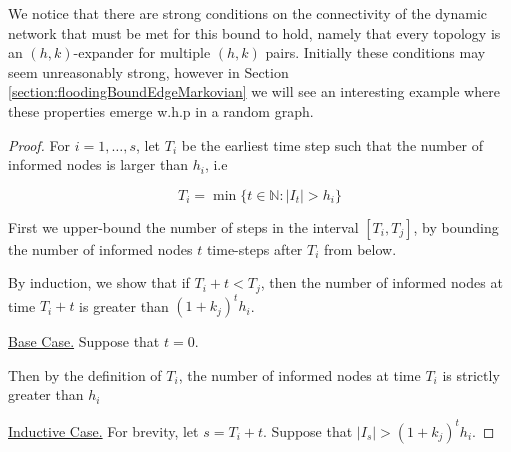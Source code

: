
We notice that there are strong conditions on the connectivity of the dynamic network that must be met for this bound to hold, namely that every topology is an $(h,k)$-expander for multiple $(h, k)$ pairs. Initially these conditions may seem unreasonably strong, however in Section \ref{section:floodingBoundEdgeMarkovian} we will see an interesting example where these properties emerge w.h.p in a random graph.

\begin{proof}
	For $i = 1,\dots, s$, let $T_i$ be the earliest time step such that the number of informed nodes is larger than $h_i$, i.e

	$$
		T_i = \min \{ t \in \mathbb{N} : |I_t| > h_i \}
	$$

	First we upper-bound the number of steps in the interval $[T_i, T_j]$, %
	by bounding the number of informed nodes $t$ time-steps after $T_i$ from below.

	By induction, we show that if $T_i + t < T_j$, then the number of informed nodes at time $T_i + t$ is greater than $(1+k_j)^t h_i$.
	
	\underline{Base Case.} Suppose that $t=0$. 
	
	Then by the definition of $T_i$, the number of informed nodes at time $T_i$ is strictly greater than $h_i$

	\underline{Inductive Case.} For brevity, let $s = T_i + t$. Suppose that $|I_s| > (1+k_j)^t h_i$.


\end{proof}
